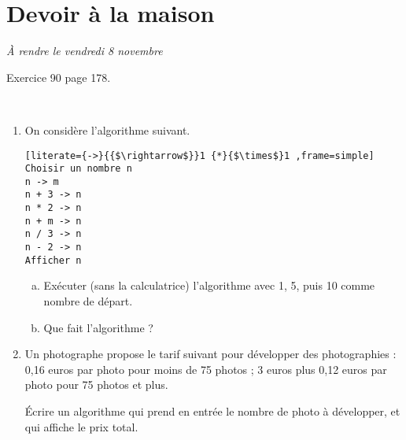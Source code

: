 \documentclass[12pt]{article}
\begin{document}
  \section*{Devoir à la maison}
  \emph{À rendre le vendredi 8 novembre}
  \setcounter{exercice}{0}

  \begin{exercice}[Vecteurs]
    Exercice 90 page 178.
  \end{exercice}

  \begin{exercice}[Algorithmique]~
    \begin{enumerate}[(1)]
      \item On considère l'algorithme suivant.
        \begin{lstlisting}[literate={->}{{$\rightarrow$}}1 {*}{$\times$}1 ,frame=simple]
Choisir un nombre n
n -> m
n + 3 -> n
n * 2 -> n
n + m -> n
n / 3 -> n
n - 2 -> n
Afficher n
        \end{lstlisting}
        \begin{enumerate}[(a)]
          \item Exécuter (sans la calculatrice) l'algorithme avec 1, 5, puis
            10 comme nombre de départ.
          \item Que fait l'algorithme ?
        \end{enumerate}
      \item Un photographe propose le tarif suivant pour développer des
        photographies : 0,16 euros par photo pour moins de 75 photos ; 3 euros
        plus 0,12 euros par photo pour 75 photos et plus.

        Écrire un algorithme qui prend en entrée le nombre de photo à
        développer, et qui affiche le prix total.
    \end{enumerate}
  \end{exercice}
\end{document}
